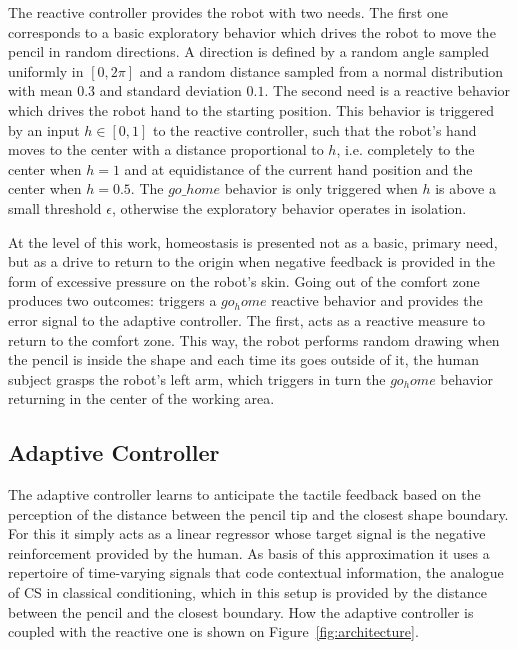 \documentclass[letterpaper, 10 pt, conference]{ieeeconf}  %
\begin{document}
The reactive controller provides the robot with two needs. The first one corresponds to a basic exploratory behavior which drives the robot to move the pencil in random directions. A direction is defined by a random angle sampled uniformly in $[0, 2\pi]$ and a random distance  sampled from a normal distribution with mean $0.3$ and standard deviation $0.1$. The second need is a reactive behavior which drives the robot hand to the starting position. This behavior is triggered by an input $h \in [0,1]$ to the reactive controller, such that the robot's hand moves to the center with a distance proportional to $h$, i.e. completely to the center when $h=1$ and at equidistance of the current hand position and the center when $h=0.5$. The $go\_home$ behavior is only triggered when $h$ is above a small threshold $\epsilon$, otherwise the exploratory behavior operates in isolation. 

At the level of this work, homeostasis is presented not as a basic, primary need, but as a drive to return to the origin when negative feedback is provided in the form of excessive pressure on the robot's skin. Going out of the comfort zone produces two outcomes: triggers a $go_home$ reactive behavior and provides the error signal to the adaptive controller. The first, acts as a reactive measure to return to the comfort zone. This way, the robot performs random drawing when the pencil is inside the shape and each time its goes outside of it, the human subject grasps the robot's left arm, which triggers in turn the $go_home$ behavior returning in the center of the working area.


\subsection{Adaptive Controller}

The adaptive controller learns to anticipate the tactile feedback based on the perception of the distance between the pencil tip and the closest shape boundary. For this it simply acts as a linear regressor whose target signal is the negative reinforcement provided by the human. As basis of this approximation it uses a repertoire of time-varying signals that code contextual information, the analogue of CS in classical conditioning, which in this setup is provided by the distance between the pencil and the closest boundary. How the adaptive controller is coupled with the reactive one is shown on Figure~\ref{fig:architecture}. 
\end{document}
